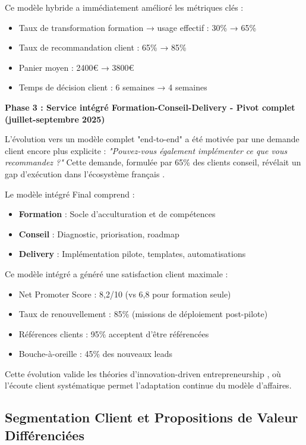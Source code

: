 Ce modèle hybride a immédiatement amélioré les métriques clés :
\begin{itemize}
    \item Taux de transformation formation → usage effectif : 30\% → 65\%
    \item Taux de recommandation client : 65\% → 85\%
    \item Panier moyen : 2400€ → 3800€
    \item Temps de décision client : 6 semaines → 4 semaines
\end{itemize}

\textbf{Phase 3 : Service intégré Formation-Conseil-Delivery - Pivot complet (juillet-septembre 2025)}

L'évolution vers un modèle complet "end-to-end" a été motivée par une demande client encore plus explicite : \emph{"Pouvez-vous également implémenter ce que vous recommandez ?"} Cette demande, formulée par 65\% des clients conseil, révélait un gap d'exécution dans l'écosystème français \cite{luwai2025evolution}.

Le modèle intégré Final comprend :
\begin{itemize}
    \item \textbf{Formation} : Socle d'acculturation et de compétences
    \item \textbf{Conseil} : Diagnostic, priorisation, roadmap
    \item \textbf{Delivery} : Implémentation pilote, templates, automatisations
\end{itemize}

Ce modèle intégré a généré une satisfaction client maximale :
\begin{itemize}
    \item Net Promoter Score : 8,2/10 (vs 6,8 pour formation seule)
    \item Taux de renouvellement : 85\% (missions de déploiement post-pilote)
    \item Références clients : 95\% acceptent d'être référencées
    \item Bouche-à-oreille : 45\% des nouveaux leads
\end{itemize}

Cette évolution valide les théories d'innovation-driven entrepreneurship \cite{aulet2013disciplined}, où l'écoute client systématique permet l'adaptation continue du modèle d'affaires.

\subsection{Segmentation Client et Propositions de Valeur Différenciées}

